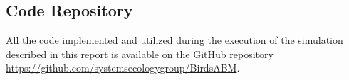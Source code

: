 %
%
%


\clearpage
\appendix
\begin{appendices}
    \section{Code Repository}
    \label{sec:code-repo}

    All the code implemented and utilized during the execution of the simulation described in this report is available on the GitHub repository \href{https://github.com/systemsecologygroup/BirdsABM}{https://github.com/systemsecologygroup/BirdsABM}.

\end{appendices}
